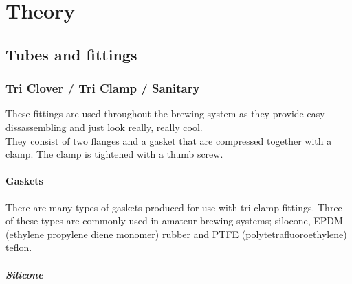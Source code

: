 \documentclass[11pt,fleqn]{book} %
\begin{document}
\tableofcontents %

\cleardoublepage %

\pagestyle{fancy} %


\part{Theory}



\chapter{Tubes and fittings}

\section{Tri Clover / Tri Clamp / Sanitary}

These fittings are used throughout the brewing system as they provide easy dissassembling and just look really, really cool.\\

They consist of two flanges and a gasket that are compressed together with a clamp. The clamp is tightened with a thumb screw.

\subsection{Gaskets}

There are many types of gaskets produced for use with tri clamp fittings. Three of these types are commonly used in amateur brewing systems; silocone, EPDM (ethylene propylene diene monomer) rubber and PTFE (polytetrafluoroethylene) teflon.

\subsubsection{Silicone}
\end{document}
